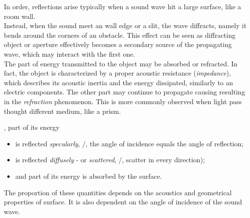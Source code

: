 In order, reflections arise typically when a sound wave hit a large surface, like a room wall.
\\Instead, when the sound meet an wall edge or a slit, the wave diffracts, namely it bends around the corners of an obstacle.
This effect can be seen as diffracting object or aperture effectively becomes a secondary source of the propagating wave, which
may interact with the first one.
\\The part of energy transmitted to the object may be absorbed or refracted.
In fact, the object is characterized by a proper acoustic resistance (\textit{impedance}), which
describes its acoustic inertia and the energy dissipated, similarly to an electric components.
The other part may continue to propagate causing resulting in the \textit{refraction} phenomenon.
This is more commonly observed when light pass thought different medium, like a prism.

, part of its energy
\begin{itemize}
    \item is reflected \textit{specularly}, \ie/, the angle of incidence equals the angle of reflection;
    \item is reflected \textit{diffusely} - or \textit{scattered}, \ie/, scatter in every direction);
    \item and part of its energy is absorbed by the surface.
\end{itemize}
The proportion of these quantities depends on the acoustics and geometrical properties of surface.
It is also dependent on the angle of incidence of the sound wave.


